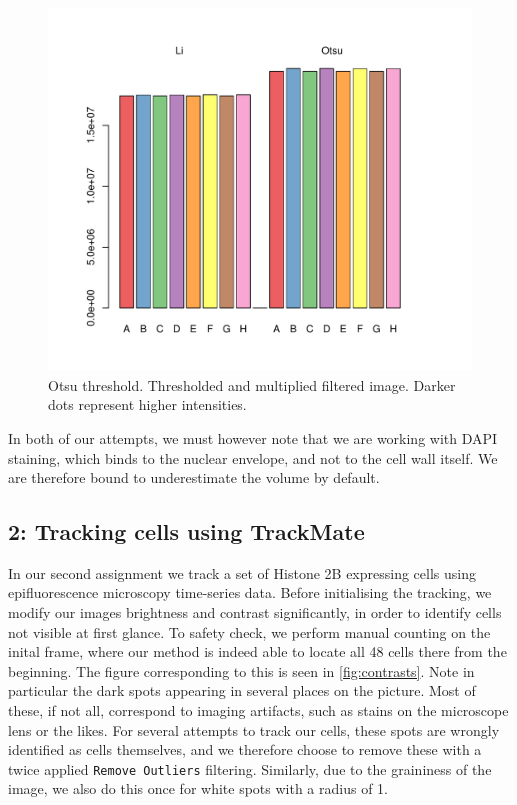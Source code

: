 \documentclass[10pt]{article}
\makeatletter
\def\maxwidth{ %
  \ifdim\Gin@nat@width>\linewidth
    \linewidth
  \else
    \Gin@nat@width
  \fi
}
\theoremstyle{plain}
\makeatother
\begin{document}
\begin{multicols*}{2}
\begin{multicols}{2}
\begin{Schunk}
\begin{figure}[H]

{\centering \includegraphics[width=\maxwidth]{figure/twocolumn-2_no_cells-1} 

}

\caption[Otsu threshold]{Otsu threshold. Thresholded and multiplied filtered image. Darker dots represent higher intensities.}\label{fig:2_no_cells}
\end{figure}
\end{Schunk}

In both of our attempts, we must however note that we are working with DAPI staining, which binds to the nuclear envelope, and not to the cell wall itself. We are therefore bound to underestimate the volume by default. 



\subsection*{2: Tracking cells using TrackMate}
In our second assignment we track a set of Histone 2B expressing cells using epifluorescence microscopy time-series data. Before initialising the tracking, we modify our images brightness and contrast significantly, in order to identify cells not visible at first glance. To safety check, we perform manual counting on the inital frame, where our method is indeed able to locate all 48 cells there from the beginning. The figure corresponding to this is seen in \cref{fig:contrasts}. Note in particular the dark spots appearing in several places on the picture. Most of these, if not all, correspond to imaging artifacts, such as stains on the microscope lens or the likes. For several attempts to track our cells, these spots are wrongly identified as cells themselves, and we therefore choose to remove these with a twice applied \texttt{Remove Outliers} filtering. Similarly, due to the graininess of the image, we also do this once for white spots with a radius of 1.
 

\end{multicols}
\end{multicols*}
\end{document}
